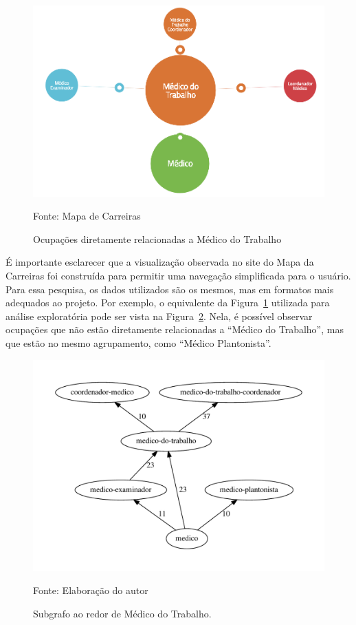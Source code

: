 \documentclass[12pt,a4paper]{article}
\newcommand{\source}[1]{\vspace{-10pt} \caption*{Fonte: {#1}} }
\begin{document}
\begin{figure}[ht]
  \centering
  \includegraphics[scale=0.25]{mapa-medico-do-trabalho.png}
  \caption{Ocupações diretamente relacionadas a Médico do Trabalho}
  \source{Mapa de Carreiras}
  \label{fig:exemplo-medico-do-trabalho}
\end{figure}

É importante esclarecer que a visualização observada no site do Mapa da Carreiras foi construída para permitir uma navegação simplificada para o usuário. Para essa pesquisa, os dados utilizados são os mesmos, mas em formatos mais adequados ao projeto. Por exemplo, o equivalente da Figura~\ref{fig:exemplo-medico-do-trabalho} utilizada para análise exploratória pode ser vista na Figura~\ref{fig:grafo-medico-do-trabalho}. Nela, é possível observar ocupações que não estão diretamente relacionadas a \enquote{Médico do Trabalho}, mas que estão no mesmo agrupamento, como \enquote{Médico Plantonista}.

\begin{figure}[ht]
  \centering
  \includegraphics[scale=0.6]{cluster_24.pdf}
  \caption{Subgrafo ao redor de Médico do Trabalho.}
  \source{Elaboração do autor}
  \label{fig:grafo-medico-do-trabalho}
\end{figure}
\end{document}
